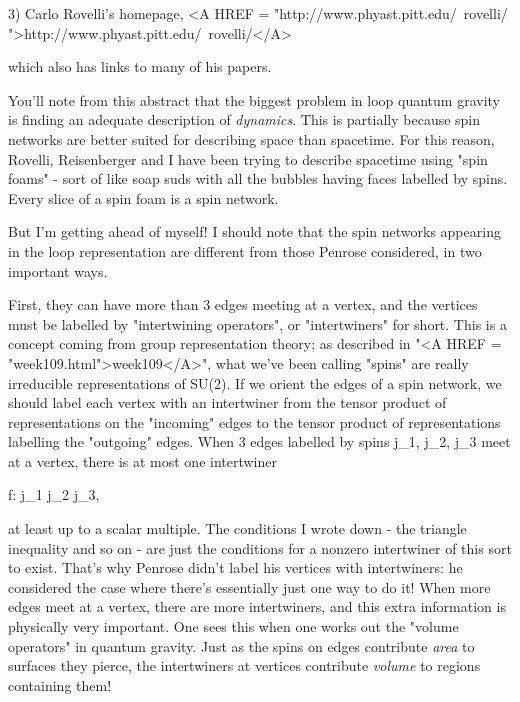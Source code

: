 3) Carlo Rovelli's homepage, <A HREF =
"http://www.phyast.pitt.edu/~rovelli/
">http://www.phyast.pitt.edu/~rovelli/</A> 

which also has links to many of his papers.

You'll note from this abstract that the biggest problem in loop quantum
gravity is finding an adequate description of \emph{dynamics}.  This is
partially because spin networks are better suited for describing space
than spacetime.  For this reason, Rovelli, Reisenberger and I have been
trying to describe spacetime using "spin foams" - sort of like soap
suds with all the bubbles having faces labelled by spins.  Every slice
of a spin foam is a spin network.

But I'm getting ahead of myself!  I should note that the spin networks
appearing in the loop representation are different from those Penrose
considered, in two important ways.

First, they can have more than 3 edges meeting at a vertex, and the
vertices must be labelled by "intertwining operators", or "intertwiners"
for short.  This is a concept coming from group representation theory;
as described in "<A HREF = "week109.html">week109</A>", what we've been calling "spins" are really
irreducible representations of SU(2).  If we orient the edges of a spin
network, we should label each vertex with an intertwiner from the tensor
product of representations on the "incoming" edges to the 
tensor product
of representations labelling the "outgoing" edges.  When 3 edges
labelled by spins j_{1}, j_{2}, j_{3} meet at a vertex, there is at most one
intertwiner

                        f: j_{1} \otimes  j_{2} \to  j_{3}, 

at least up to a scalar multiple.  The conditions I wrote down - the
triangle inequality and so on - are just the conditions for a nonzero
intertwiner of this sort to exist.  That's why Penrose didn't label his
vertices with intertwiners: he considered the case where there's
essentially just one way to do it!  When more edges meet at a vertex,
there are more intertwiners, and this extra information is physically
very important.  One sees this when one works out the "volume operators"
in quantum gravity.  Just as the spins on edges contribute \emph{area} to
surfaces they pierce, the intertwiners at vertices contribute \emph{volume}
to regions containing them!

